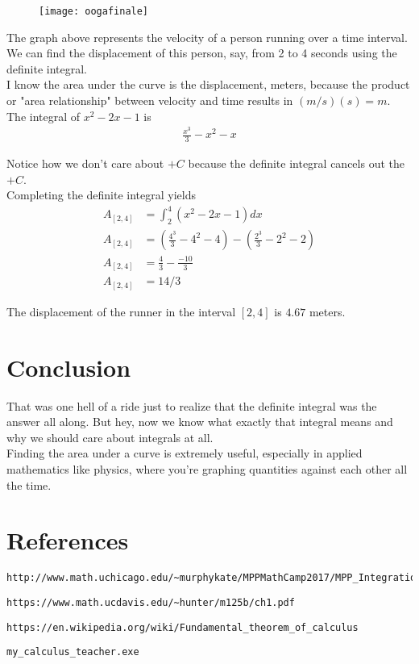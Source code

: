 \documentclass{article}
\begin{document}
\begin{figure}[htbp!]
\centering
\texttt{[image: oogafinale]}
\end{figure}

\noindent
The graph above represents the velocity of a person running over a time interval. We can find the displacement of this person, say, from 2 to 4 seconds using the definite integral. \\

\noindent
I know the area under the curve is the displacement, meters, because the product or "area relationship" between velocity and time results in $(m/s)(s) = m$. \\

\noindent
The integral of $x^{2}-2x-1$ is 
\begin{align}
\frac{x^{3}}{3}-x^{2}-x
\end{align}

\noindent
Notice how we don't care about $+C$ because the definite integral cancels out the $+C$. \\

\noindent
Completing the definite integral yields
\begin{align}
A_{[2,4]} &= \int_{2}^{4}(x^{2}-2x-1)dx \\
A_{[2,4]} &= (\frac{4^{3}}{3}-4^{2}-4) - (\frac{2^{3}}{3}-2^{2}-2) \\
A_{[2,4]} &= \frac{4}{3}-\frac{-10}{3} \\
A_{[2,4]} &= 14/3
\end{align}

\noindent
The displacement of the runner in the interval $[2,4]$ is $4.67$ meters.
\section{Conclusion}
\noindent
That was one hell of a ride just to realize that the definite integral was the answer all along. But hey, now we know what exactly that integral means and why we should care about integrals at all. \\

\noindent
Finding the area under a curve is extremely useful, especially in applied mathematics like physics, where you're graphing quantities against each other all the time. \\

\section{References}
\begin{verbatim}
http://www.math.uchicago.edu/~murphykate/MPPMathCamp2017/MPP_Integration.pdf
\end{verbatim}

\begin{verbatim}
https://www.math.ucdavis.edu/~hunter/m125b/ch1.pdf
\end{verbatim}

\begin{verbatim}
https://en.wikipedia.org/wiki/Fundamental_theorem_of_calculus
\end{verbatim}

\begin{verbatim}
my_calculus_teacher.exe
\end{verbatim}
\end{document}
